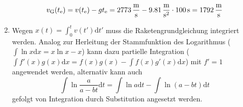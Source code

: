 \documentclass[a4paper]{scrartcl}
\begin{document}
\begin{enumerate}[noitemsep]
  \begin{equation*}
    v_\text{G}(t_\text{e}) = v(t_\text{e}) - gt_\text{e} = \unit[2773]{\frac{m}{s}} - \unit[9.81]{\frac{m}{s^2}}\cdot\unit[100]{s} = \unit[1792]{\frac{m}{s}}
  \end{equation*}
\item Wegen $x(t) = \int_0^t v(t')\text{d}t'$ muss die Raketengrundgleichung integriert werden. Analog zur Herleitung der Stammfunktion des Logarithmus ($\int \ln x \text{d}x = x \ln x - x$) kann dazu partielle Integration ($\int f'(x)g(x)\text{d}x = f(x)g(x) - \int f(x)g'(x)\text{d}x$) mit $f' = 1$ angewendet werden, alternativ kann auch
  \begin{equation*}
    \int \ln \frac{a}{a-bt}\text{d}t = \int \ln a \text{d}t - \int \ln (a-bt)\text{d}t
  \end{equation*}
  gefolgt von Integration durch Substitution angesetzt werden.


\end{enumerate}
\end{document}
